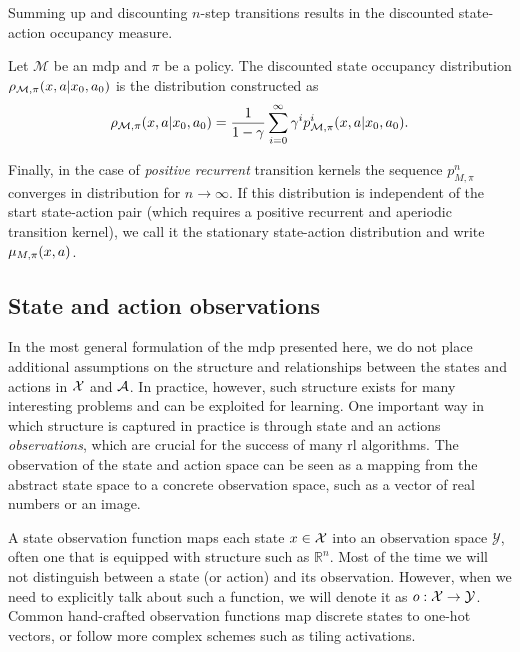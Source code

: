 Summing up and discounting $n$-step transitions results in the discounted state-action occupancy measure.

\begin{definition}
    Let $\mathcal{M}$ be an \ac{mdp} and $\pi$ be a policy.
    The discounted state occupancy distribution $\rho_{\mathcal{M},\pi}(x,a|x_0,a_0)$ is the distribution constructed as $$\rho_{\mathcal{M},\pi}(x,a|x_0,a_0) = \frac{1}{1 - \gamma} \sum_{i=0}^\infty \gamma^i p^i_{\mathcal{M},\pi}(x,a|x_0,a_0).$$
\end{definition}

Finally, in the case of \emph{positive recurrent} transition kernels the sequence $p^n_{M,\pi}$ converges in distribution for $n \rightarrow \infty$.
If this distribution is independent of the start state-action pair (which requires a positive recurrent and aperiodic transition kernel), we call it the stationary state-action distribution and write $\mu_{M,\pi}(x,a)$.

\subsection{State and action observations}

In the most general formulation of the \ac{mdp} presented here, we do not place additional assumptions on the structure and relationships between the states and actions in $\mathcal{X}$ and $\mathcal{A}$.
In practice, however, such structure exists for many interesting problems and can be exploited for learning.
One important way in which structure is captured in practice is through state and an actions \emph{observations}, which are crucial for the success of many \ac{rl} algorithms.
The observation of the state and action space can be seen as a mapping from the abstract state space to a concrete observation space, such as a vector of real numbers or an image.

A state observation function maps each state $x\in\mathcal{X}$ into an observation space $\mathcal{Y}$, often one that is equipped with structure such as $\mathbb{R}^n$.
Most of the time we will not distinguish between a state (or action) and its observation.
However, when we need to explicitly talk about such a function, we will denote it as $o: \mathcal{X} \rightarrow \mathcal{Y}$.
Common hand-crafted observation functions map discrete states to one-hot vectors, or follow more complex schemes such as tiling activations.

